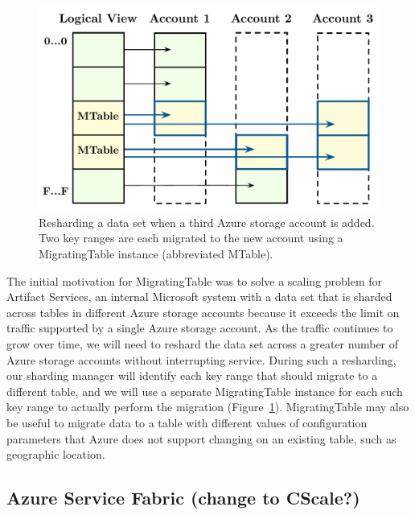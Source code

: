 \begin{figure}[t]
\centering
\includegraphics[width=\linewidth]{img/livemigration}
\caption{Resharding a data set when a third Azure storage account is added. Two key ranges are each migrated to the new account using a MigratingTable instance (abbreviated MTable).}
\label{fig:livemigration}
\end{figure}

The initial motivation for MigratingTable was to solve a scaling problem for Artifact Services, an internal Microsoft system with a data set that is sharded across tables in different Azure storage accounts because it exceeds the limit on traffic supported by a single Azure storage account.  As the traffic continues to grow over time, we will need to reshard the data set across a greater number of Azure storage accounts without interrupting service.  During such a resharding, our sharding manager will identify each key range that should migrate to a different table, and we will use a separate MigratingTable instance for each such key range to actually perform the migration (Figure~\ref{fig:livemigration}).  MigratingTable may also be useful to migrate data to a table with different values of configuration parameters that Azure does not support changing on an existing table, such as geographic location.

\subsection{Azure Service Fabric (change to CScale?)}
\label{sec:cases:fabric}

